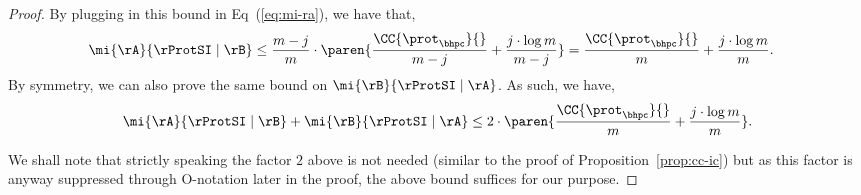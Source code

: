 \begin{proof}
By plugging in this bound in Eq~(\ref{eq:mi-ra}), we have that,
\begin{align*}
	\mi{\rA}{\rProtSI \mid \rB} &\leq \frac{m-j}{m} \cdot \paren{\frac{\CC{\prot_\bhpc}{} }{m-j}   + \frac{j \cdot \log{m}}{m-j}} = \frac{\CC{\prot_\bhpc}{} }{m}   + \frac{j \cdot \log{m}}{m}. 
\end{align*}
By symmetry, we can also prove the same bound on $\mi{\rB}{\rProtSI \mid \rA}$. As such, we have,
\begin{align*}
	\mi{\rA}{\rProtSI \mid \rB} + \mi{\rB}{\rProtSI \mid \rA} \leq 2 \cdot \paren{\frac{\CC{\prot_\bhpc}{} }{m}   + \frac{j \cdot \log{m}}{m}}.
\end{align*}

We shall note that strictly speaking the factor $2$ above is not needed (similar to the proof of Proposition~\ref{prop:cc-ic}) but as this factor is anyway suppressed through O-notation later in the proof, the above bound
suffices for our purpose. %

\end{proof}

